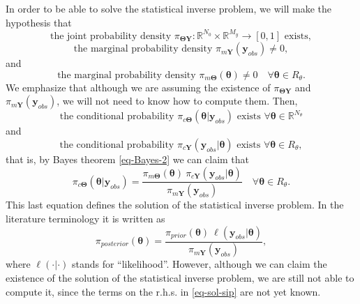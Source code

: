 In order to be able to solve the statistical inverse problem, we will make the hypothesis that
\begin{equation}\label{eq-hyp-jpd}
\mbox{the joint probability density }\pi_{\boldsymbol{\Theta}\mathbf{Y}}:\mathbb{R}^{N_0}\times\mathbb{R}^{M_y}\rightarrow [0,1]\mbox{ exists},
\end{equation}
\begin{equation}\label{eq-hyp-obs-mp}
\mbox{the marginal probability density }\pi_{m\mathbf{Y}}(\mathbf{y}_{obs})\neq 0,
\end{equation}
and
\begin{equation}\label{eq-hyp-theta-mp}
\mbox{the marginal probability density }\pi_{m\boldsymbol{\Theta}}(\boldsymbol{\theta})\neq 0\quad\forall\boldsymbol\theta\in R_{\theta}.
\end{equation}
We emphasize that although we are assuming the existence of
$\pi_{\boldsymbol{\Theta}\mathbf{Y}}$ and
$\pi_{m\mathbf{Y}}(\mathbf{y}_{obs})$,
we will not need to know how to compute them.
Then,
\begin{equation*}
\mbox{the conditional probability }\pi_{c\boldsymbol\Theta}(\boldsymbol\theta|\mathbf{y}_{obs})\mbox{ exists }\forall\boldsymbol\theta\in\mathbb{R}^{N_\theta}
\end{equation*}
and
\begin{equation*}
\mbox{the conditional probability }\pi_{c\mathbf{Y}}(\mathbf{y}_{obs}|\boldsymbol\theta)\mbox{ exists }\forall\boldsymbol\theta\in R_{\theta},
\end{equation*}
that is, by Bayes theorem \eqref{eq-Bayes-2} we can claim that
\begin{equation*}
\pi_{c\boldsymbol\Theta}(\boldsymbol\theta|\mathbf{y}_{obs})
=
\frac
{\pi_{m\boldsymbol{\Theta}}(\boldsymbol{\theta})~\pi_{c\mathbf{Y}}(\mathbf{y}_{obs}|\boldsymbol\theta)}
{\pi_{m\mathbf{Y}}(\mathbf{y}_{obs})}
\quad\forall\boldsymbol\theta\in R_{\theta}.
\end{equation*}
This last equation defines the solution of the statistical inverse problem. In the literature terminology it is written as
\begin{equation}\label{eq-sol-sip}
\pi_{posterior}(\boldsymbol\theta)
=
\frac
{\pi_{prior}(\boldsymbol{\theta})~\ell(\mathbf{y}_{obs}|\boldsymbol\theta)}
{\pi_{m\mathbf{Y}}(\mathbf{y}_{obs})},
\end{equation}
where $\ell(\cdot|\cdot)$ stands for ``likelihood''.
However, although we can claim the existence of the solution of the statistical inverse problem,
we are still not able to compute it, since the terms on the r.h.s. in \eqref{eq-sol-sip} are not yet known.

